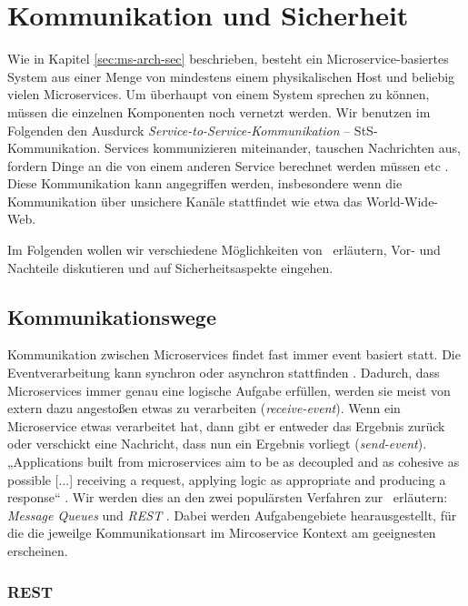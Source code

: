 \section{Kommunikation und Sicherheit}
\label{sec:kommunikation}

Wie in Kapitel \ref{sec:ms-arch-sec} beschrieben, besteht ein Microservice-basiertes System aus einer Menge von mindestens einem physikalischen Host und beliebig vielen Microservices. Um überhaupt von einem System sprechen zu können, müssen die einzelnen Komponenten noch vernetzt werden. Wir benutzen im Folgenden den Ausdurck \textit{Service-to-Service-Kommunikation} -- StS-Kommunikation. Services kommunizieren miteinander, tauschen Nachrichten aus, fordern Dinge an die von einem anderen Service berechnet werden müssen etc \cite{newman2015}. Diese Kommunikation kann angegriffen werden, insbesondere wenn die Kommunikation über unsichere Kanäle stattfindet wie etwa das World-Wide-Web.

Im Folgenden wollen wir verschiedene Möglichkeiten von \stscom\ erläutern, Vor- und Nachteile diskutieren und auf Sicherheitsaspekte eingehen.

\subsection{Kommunikationswege}

Kommunikation zwischen Microservices findet fast immer event basiert statt. Die Eventverarbeitung kann synchron oder asynchron stattfinden \cite{newman2015}. Dadurch, dass Microservices immer genau eine logische Aufgabe erfüllen, werden sie meist von extern dazu angestoßen etwas zu verarbeiten (\textit{receive-event}). Wenn ein Microservice etwas verarbeitet hat, dann gibt er entweder das Ergebnis zurück oder verschickt eine Nachricht, dass nun ein Ergebnis vorliegt (\textit{send-event}). „Applications built from microservices aim to be as decoupled and as cohesive as possible [...] receiving a request, applying logic as appropriate and producing a response“ \cite{Fowler+14}. Wir werden dies an den zwei populärsten Verfahren zur \stscom\ erläutern: \textit{Message Queues} und \textit{REST} \cite{Fowler+14,newman2015}. Dabei werden Aufgabengebiete hearausgestellt, für die die jeweilge Kommunikationsart im Mircoservice Kontext am geeignesten erscheinen.

\subsubsection{REST}

